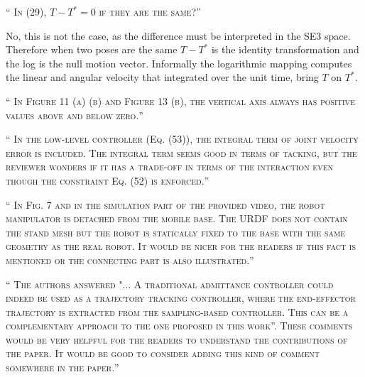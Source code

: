 \documentclass[10pt]{article}
\newcommand{\referee}[1]{\;
  \begin{minipage}[t]{.95\textwidth}
    ``{\small\color{red} \textsc{#1}}''
  \end{minipage}\medskip
  }
\begin{document}
\begin{enumerate}[label={[R2:\,\arabic{enumi}]}]
\item\label{reply:R2:9}
\referee{In (29), $T-T^*=0$ if they are the same?}

No, this is not the case, as the difference must be interpreted in the SE3 space. Therefore when two poses are the same $T-T^*$ is the identity transformation and the log is the null motion vector. Informally the logarithmic mapping computes the linear and angular velocity that integrated over the unit time, bring $T$ on $T^*$. 

\item\label{reply:R2:10}
\referee{In Figure 11 (a) (b) and Figure 13 (b), the vertical axis always has
positive values above and below zero.}


\item\label{reply:R2:11}
\referee{In the low-level controller (Eq. (53)), the integral term of joint
velocity error is included. The integral term seems good in terms of
tacking, but the reviewer wonders if it has a trade-off in terms of the
interaction even though the constraint Eq. (52) is enforced.}


\item\label{reply:R2:12}
\referee{In Fig. 7 and in the simulation part of the provided video,
the robot manipulator is detached from the mobile base. The URDF does not contain the stand mesh but the robot is statically fixed to the base with the same geometry as the real robot. It would be nicer for the readers if this fact is mentioned or the connecting part is also illustrated.}


\item\label{reply:R2:13}
\referee{The authors answered "... A traditional admittance controller
could indeed be used as a trajectory tracking controller, where the
end-effector trajectory is extracted from the sampling-based
controller. This can be a complementary approach to the one proposed in
this work”. These comments would be very helpful for the readers to
understand the contributions of the paper. It would be good to consider
adding this kind of comment somewhere in the paper.}


\end{enumerate}
\end{document}
